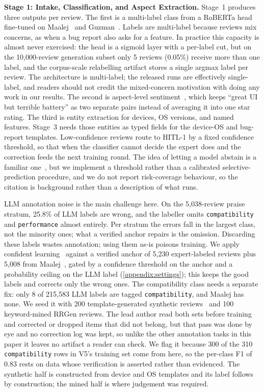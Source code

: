 \documentclass[preprint,12pt]{elsarticle}
\begin{document}
\textbf{Stage 1: Intake, Classification, and Aspect Extraction.}
  Stage~1 produces three outputs per review. The first is a multi-label class from a RoBERTa
  head fine-tuned on Maalej~\cite{maalej2015bug} and Guzman~\cite{guzman2014users}. Labels are
  multi-label because reviews mix concerns, as when a bug report also asks for a feature. In
  practice this capacity is almost never exercised: the head is a sigmoid layer with a per-label
  cut, but on the 10{,}000-review generation subset only 5 reviews (0.05\%) receive more than one
  label, and the corpus-scale relabelling artifact stores a single argmax label per review. The
  architecture is multi-label; the released runs are effectively single-label, and readers should
  not credit the mixed-concern motivation with doing any work in our results. The
  second is aspect-level sentiment~\cite{guzman2014users}, which keeps ``great UI but terrible
  battery'' as two separate pairs instead of averaging it into one star rating. The third is
  entity extraction for devices, OS versions, and named features. Stage~3 needs those entities
  as typed fields for the device-OS and bug-report templates.
  Low-confidence reviews route to HITL-1 by a fixed confidence threshold, so that when the
  classifier cannot decide the expert does and the correction feeds the next training round. The
  idea of letting a model abstain is a familiar one~\cite{geifman2017selective}, but we implement
  a threshold rather than a calibrated selective-prediction procedure, and we do not report
  risk-coverage behaviour, so the citation is background rather than a description of what runs.

  LLM annotation noise is the main challenge here. On the
  5{,}038-review praise stratum, 25.8\% of LLM labels are wrong,
  and the labeller omits \texttt{compatibility} and \texttt{performance} almost entirely. Per
  stratum the errors fall in the largest class, not the minority ones; what a verified anchor
  repairs is the omission. Discarding these labels wastes annotation;
  using them as-is poisons training. We apply confident
  learning~\cite{northcutt2021confident} against a verified anchor of
  5{,}230 expert-labeled reviews plus 5{,}008 from
  Maalej~\cite{maalej2015bug}, gated by a confidence threshold on the anchor and a probability
  ceiling on the LLM label (\ref{appendix:settings}); this keeps the good labels and
  corrects only the wrong ones. The compatibility class needs a separate fix:
  only 8 of 215{,}583 LLM labels are tagged \texttt{compatibility}, and
  Maalej has none. We seed it with 200 template-generated synthetic
  reviews~\cite{joorabchi2013real} and 100 keyword-mined RRGen reviews. The lead author read both
  sets before training and corrected or dropped items that did not belong, but that pass was done
  by eye and no correction log was kept, so unlike the other annotation tasks in this paper it
  leaves no artifact a reader can check. We flag it because 300 of the 310 \texttt{compatibility}
  rows in V5's training set come from here, so the per-class F1 of 0.83 rests on data whose
  verification is asserted rather than evidenced. The synthetic half is constructed from device
  and OS templates and its label follows by construction; the mined half is where judgement was
  required.
  
\end{document}
